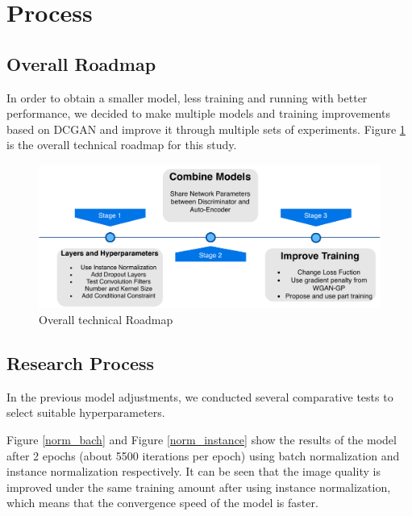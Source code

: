 \section{Process}
\subsection{Overall Roadmap}

In order to obtain a smaller model, less training and running with better performance,
we decided to make multiple models and training improvements based on DCGAN and improve it through multiple sets of experiments.
Figure \ref{roadmap} is the overall technical roadmap for this study.

\begin{figure}
    \begin{center}
    \includegraphics[width=\textwidth]{figures/roadmap.pdf}
    \caption{Overall technical Roadmap}
    \label{roadmap}
    \end{center}
\end{figure}


\subsection{Research Process}

In the previous model adjustments, we conducted several comparative tests to select suitable hyperparameters.

Figure \ref{norm_bach} and Figure \ref{norm_instance} show the results of the model after 2 epochs (about 5500 iterations per epoch) using batch normalization and instance normalization respectively.
It can be seen that the image quality is improved under the same training amount after using instance normalization, which means that the convergence speed of the model is faster.


